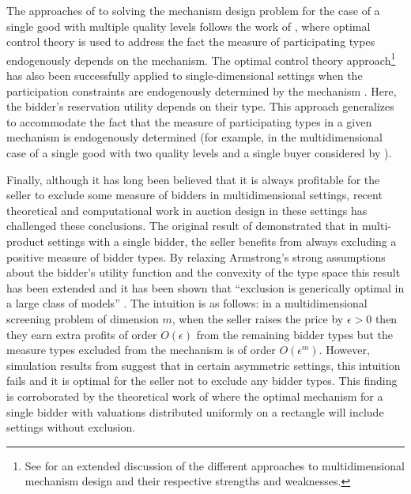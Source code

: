 \documentclass{article}
\begin{document}
The approaches of \autocite{pavlov2011optimal, thirumulanathan2019unitdemand} to solving the mechanism design problem for the case of a single good with multiple quality levels follows the work of \autocite{guesnerie1984complete}, where optimal control theory is used to address the fact the measure of participating types endogenously depends on the mechanism. The optimal control theory approach\footnote{See \autocite[\S 7]{basov2005multidimensional} for an extended discussion of the different approaches to multidimensional mechanism design and their respective strengths and weaknesses.} has also been successfully applied to single-dimensional settings when the participation constraints are endogenously determined by the mechanism \autocite{jullien2000}. Here, the bidder's reservation utility depends on their type. This approach generalizes to accommodate the fact that the measure of participating types in a given mechanism is endogenously determined (for example, in the multidimensional case of a single good with two quality levels and a single buyer considered by \cite{pavlov2011optimal,thirumulanathan2019unitdemand}).

Finally, although it has long been believed that it is always profitable for the seller to exclude some measure of bidders \autocite{rochet1998ironing,armstrong1996multiproduct} in multidimensional settings, recent theoretical and computational work in auction design in these settings has challenged these conclusions. The original result of \autocite{armstrong1996multiproduct} demonstrated that in multi-product settings with a single bidder, the seller benefits from always excluding a positive measure of bidder types. By relaxing Armstrong's strong assumptions about the bidder's utility function and the convexity of the type space this result has been extended and it has been shown that ``exclusion is generically optimal in a large class of models'' \autocite[75]{barelli2014exclusion}. The intuition is as follows: in a multidimensional screening problem of dimension $m$, when the seller raises the price by $\epsilon>0$ then they earn extra profits of order $O(\epsilon)$ from the remaining bidder types but the measure types excluded from the mechanism is of order $O(\epsilon^m)$. However, simulation results from \autocite{belloni2010multidimensional} suggest that in certain asymmetric settings, this intuition fails and it is optimal for the seller not to exclude any bidder types. This finding is corroborated by the theoretical work of \autocite{thirumulanathan2019unitdemand} where the optimal mechanism for a single bidder with valuations distributed uniformly on a rectangle will include settings without exclusion.
\end{document}
